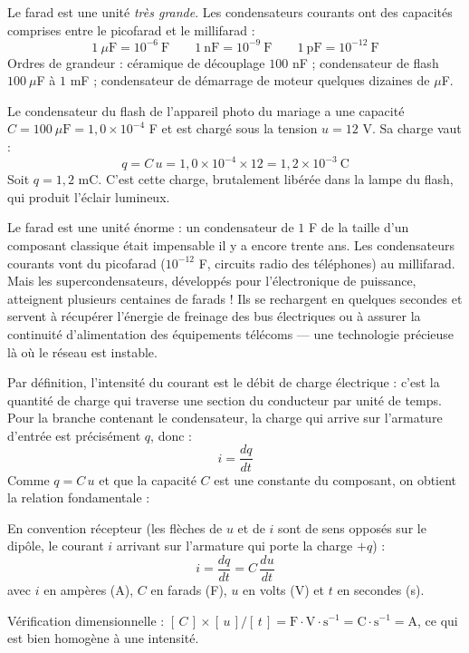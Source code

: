 \documentclass[11pt]{article}
\newcommand{\cle}[1]{{\popxbold\color{popdark}#1}}
\newcounter{popsec}
\newcounter{popsub}
\newcommand{\courssub}[1]{%
  \stepcounter{popsub}%
  \par\vspace{9pt}\noindent{\popxbold\fontsize{11.5}{13}\selectfont\color{popink}{\color{poporange}\thepopsec.\thepopsub}\hspace{6pt}#1}\par\nopagebreak\vspace{4pt}
}
\begin{document}
\begin{aretenir}
Le farad est une unité \emph{très grande}. Les condensateurs courants ont des capacités comprises entre le picofarad et le millifarad :
\[ 1~\mu\text{F} = 10^{-6}~\text{F} \qquad 1~\text{nF} = 10^{-9}~\text{F} \qquad 1~\text{pF} = 10^{-12}~\text{F} \]
Ordres de grandeur : céramique de découplage $100$ nF ; condensateur de flash $100~\mu$F à $1$ mF ; condensateur de démarrage de moteur quelques dizaines de $\mu$F.
\end{aretenir}

\begin{exemplebox}
Le condensateur du flash de l'appareil photo du mariage a une capacité $C = 100~\mu\text{F} = 1,0\times 10^{-4}$ F et est chargé sous la tension $u = 12$ V. Sa charge vaut :
\[ q = C\,u = 1,0\times 10^{-4} \times 12 = 1,2\times 10^{-3}~\text{C} \]
Soit $q = 1,2$ mC. C'est cette charge, brutalement libérée dans la lampe du flash, qui produit l'éclair lumineux.
\end{exemplebox}

\begin{savaistu}
Le farad est une unité énorme : un condensateur de $1$ F de la taille d'un composant classique était impensable il y a encore trente ans. Les condensateurs courants vont du picofarad ($10^{-12}$ F, circuits radio des téléphones) au millifarad. Mais les \cle{supercondensateurs}, développés pour l'électronique de puissance, atteignent plusieurs centaines de farads ! Ils se rechargent en quelques secondes et servent à récupérer l'énergie de freinage des bus électriques ou à assurer la continuité d'alimentation des équipements télécoms — une technologie précieuse là où le réseau est instable.
\end{savaistu}

\courssub{Intensité du courant dans la branche : $i = C\,\dfrac{du}{dt}$}

Par définition, l'intensité du courant est le débit de charge électrique : c'est la quantité de charge qui traverse une section du conducteur par unité de temps. Pour la branche contenant le condensateur, la charge qui arrive sur l'armature d'entrée est précisément $q$, donc :
\[ i = \frac{dq}{dt} \]
Comme $q = C\,u$ et que la capacité $C$ est une constante du composant, on obtient la relation fondamentale :

\begin{propriete}
En \cle{convention récepteur} (les flèches de $u$ et de $i$ sont de sens opposés sur le dipôle, le courant $i$ arrivant sur l'armature qui porte la charge $+q$) :
\[ i = \frac{dq}{dt} = C\,\frac{du}{dt} \]
avec $i$ en ampères (A), $C$ en farads (F), $u$ en volts (V) et $t$ en secondes (s).

Vérification dimensionnelle : $[\,C\,]\times[\,u\,]/[\,t\,] = \text{F}\cdot\text{V}\cdot\text{s}^{-1} = \text{C}\cdot\text{s}^{-1} = \text{A}$, ce qui est bien homogène à une intensité.
\end{propriete}
\end{document}
